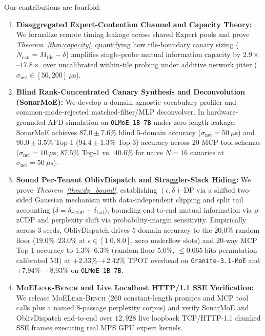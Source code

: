 \documentclass[final,5p,times,twocolumn]{elsarticle}
\def\SM{SonarMoE}%
\def\OD{OblivDispatch}%
\theoremstyle{definition}
\theoremstyle{remark}
\newcommand{\SM}{\textsc{SonarMoE}}
\newcommand{\OD}{\textsc{OblivDispatch}}
\newcommand{\MLB}{\textsc{MoELeak-Bench}}
\begin{document}
Our contributions are fourfold:
\begin{enumerate}
  \item \textbf{Disaggregated Expert-Contention Channel and Capacity Theory:} We formalize remote timing leakage across shared Expert pools and prove \emph{Theorem~\ref{thm:capacity}}, quantifying how tile-boundary canary sizing ($N_{\mathrm{can}} = M_{\mathrm{tile}} - \delta$) amplifies single-probe mutual information capacity by $2.9\times$--$17.8\times$ over uncalibrated within-tile probing under additive network jitter ($\sigma_{\mathrm{net}} \in [50, 200]~\mu\mathrm{s}$).
  \item \textbf{Blind Rank-Concentrated Canary Synthesis and Deconvolution (\SM{}):} We develop a domain-agnostic vocabulary profiler and common-mode-rejected matched-filter/MLP deconvolver. In hardware-grounded AFD simulation on \texttt{OLMoE-1B-7B} under zero length leakage, \SM{} achieves $87.0 \pm 7.6\%$ blind $5$-domain accuracy ($\sigma_{\mathrm{net}} = 50~\mu\mathrm{s}$) and $90.0 \pm 3.5\%$ Top-1 ($94.4 \pm 1.3\%$ Top-3) accuracy across $20$ MCP tool schemas ($\sigma_{\mathrm{net}} = 10~\mu\mathrm{s}$; $87.5\%$ Top-1 vs.\ $40.6\%$ for naive $N=16$ canaries at $\sigma_{\mathrm{net}} = 50~\mu\mathrm{s}$).
  \item \textbf{Sound Per-Tenant \OD{} and Straggler-Slack Hiding:} We prove \emph{Theorem~\ref{thm:dp_bound}}, establishing $(\epsilon, \delta)$-DP via a shifted two-sided Gaussian mechanism with data-independent clipping and split tail accounting ($\delta = \delta_{\mathrm{zCDP}} + \delta_{\mathrm{tail}}$), bounding end-to-end mutual information via $\rho$-zCDP and perplexity shift via probability-margin sensitivity. Empirically across $3$ seeds, \OD{} drives $5$-domain accuracy to the $20.0\%$ random floor ($19.0\%$--$23.0\%$ at $\epsilon \in [1.0, 8.0]$, zero underflow slots) and $20$-way MCP Top-1 accuracy to $1.3\%$--$6.3\%$ (random floor $5.0\%$, $\le 0.065~\mathrm{bits}$ permutation-calibrated MI) at $+2.33\%$--$+2.42\%$ TPOT overhead on \texttt{Granite-3.1-MoE} and $+7.94\%$--$+8.93\%$ on \texttt{OLMoE-1B-7B}.
  \item \textbf{\MLB{} and Live Localhost HTTP/1.1 SSE Verification:} We release \MLB{} ($260$ constant-length prompts and MCP tool calls plus a named $8$-passage perplexity corpus) and verify \SM{} and \OD{} end-to-end over $12{,}928$ live loopback TCP/HTTP-1.1 chunked SSE frames executing real MPS GPU expert kernels.
\end{enumerate}
\end{document}
